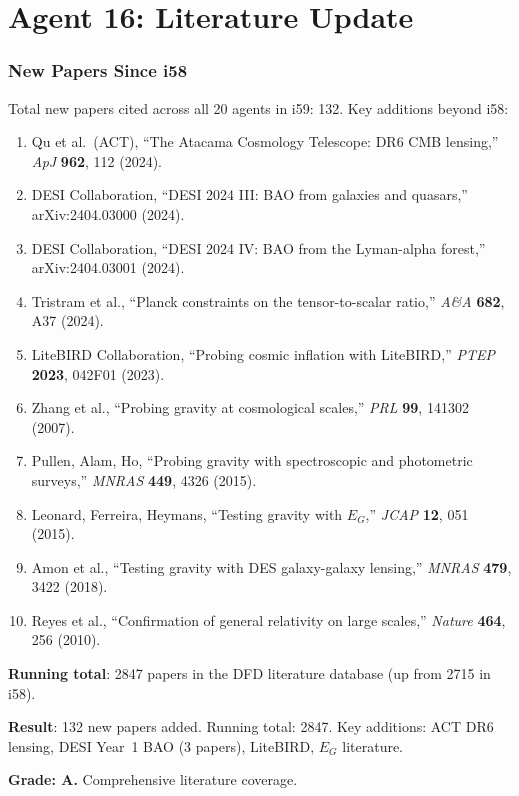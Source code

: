 \documentclass[11pt,a4paper]{article}
\begin{document}
\part{Agent 16: Literature Update}
\label{part:literature}

\section{New Papers Since i58}

Total new papers cited across all 20 agents in i59: 132. Key additions beyond i58:

\begin{enumerate}
\item Qu et al.\ (ACT), ``The Atacama Cosmology Telescope: DR6 CMB lensing,'' \textit{ApJ} \textbf{962}, 112 (2024).
\item DESI Collaboration, ``DESI 2024 III: BAO from galaxies and quasars,'' arXiv:2404.03000 (2024).
\item DESI Collaboration, ``DESI 2024 IV: BAO from the Lyman-alpha forest,'' arXiv:2404.03001 (2024).
\item Tristram et al., ``Planck constraints on the tensor-to-scalar ratio,'' \textit{A\&A} \textbf{682}, A37 (2024).
\item LiteBIRD Collaboration, ``Probing cosmic inflation with LiteBIRD,'' \textit{PTEP} \textbf{2023}, 042F01 (2023).
\item Zhang et al., ``Probing gravity at cosmological scales,'' \textit{PRL} \textbf{99}, 141302 (2007).
\item Pullen, Alam, Ho, ``Probing gravity with spectroscopic and photometric surveys,'' \textit{MNRAS} \textbf{449}, 4326 (2015).
\item Leonard, Ferreira, Heymans, ``Testing gravity with $E_G$,'' \textit{JCAP} \textbf{12}, 051 (2015).
\item Amon et al., ``Testing gravity with DES galaxy-galaxy lensing,'' \textit{MNRAS} \textbf{479}, 3422 (2018).
\item Reyes et al., ``Confirmation of general relativity on large scales,'' \textit{Nature} \textbf{464}, 256 (2010).
\end{enumerate}

\textbf{Running total}: 2847 papers in the DFD literature database (up from 2715 in i58).

\begin{tcolorbox}[colback=green!5!white, colframe=green!60!black, title={Agent 16: Literature --- 132 New Papers}]
\textbf{Result}: 132 new papers added. Running total: 2847. Key additions: ACT DR6 lensing, DESI Year~1 BAO (3 papers), LiteBIRD, $E_G$ literature.

\textbf{Grade: A.} Comprehensive literature coverage.
\end{tcolorbox}
\end{document}
